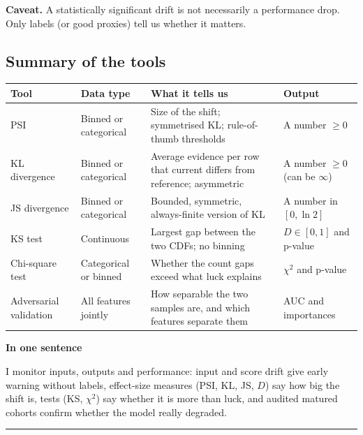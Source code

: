\documentclass[11pt]{article}
\begin{document}
\textbf{Caveat.} A statistically significant drift is not necessarily a performance drop. Only labels (or good proxies) tell us whether it matters.

\subsection{Summary of the tools}

\begin{center}
\begin{tabular}{|p{3.2cm}|p{2.8cm}|p{5.2cm}|p{2.8cm}|}
\hline
\textbf{Tool} & \textbf{Data type} & \textbf{What it tells us} & \textbf{Output} \\
\hline
PSI & Binned or categorical & Size of the shift; symmetrised KL; rule-of-thumb thresholds & A number \(\ge0\) \\
\hline
KL divergence & Binned or categorical & Average evidence per row that current differs from reference; asymmetric & A number \(\ge0\) (can be \(\infty\)) \\
\hline
JS divergence & Binned or categorical & Bounded, symmetric, always-finite version of KL & A number in \([0,\ln2]\) \\
\hline
KS test & Continuous & Largest gap between the two CDFs; no binning & \(D\in[0,1]\) and p-value \\
\hline
Chi-square test & Categorical or binned & Whether the count gaps exceed what luck explains & \(\chi^2\) and p-value \\
\hline
Adversarial validation & All features jointly & How separable the two samples are, and which features separate them & AUC and importances \\
\hline
\end{tabular}
\end{center}

\textbf{In one sentence}

I monitor inputs, outputs and performance: input and score drift give early warning without labels, effect-size measures (PSI, KL, JS, \(D\)) say how big the shift is, tests (KS, \(\chi^2\)) say whether it is more than luck, and audited matured cohorts confirm whether the model really degraded.

\vspace{5mm}
\hrule
\vspace{5mm}

\end{document}
